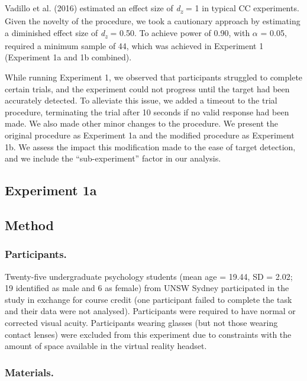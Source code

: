 \documentclass[
  english,
  man,floatsintext]{apa7}
\begin{document}
Vadillo et al. (2016) estimated an effect size of \emph{d\textsubscript{z}} = 1 in typical CC experiments. Given the novelty of the procedure, we took a cautionary approach by estimating a diminished effect size of \emph{d\textsubscript{z}} = 0.50. To achieve power of 0.90, with \(\alpha\) = 0.05, required a minimum sample of 44, which was achieved in Experiment 1 (Experiment 1a and 1b combined).

While running Experiment 1, we observed that participants struggled to complete certain trials, and the experiment could not progress until the target had been accurately detected. To alleviate this issue, we added a timeout to the trial procedure, terminating the trial after 10 seconds if no valid response had been made. We also made other minor changes to the procedure. We present the original procedure as Experiment 1a and the modified procedure as Experiment 1b. We assess the impact this modification made to the ease of target detection, and we include the ``sub-experiment'' factor in our analysis.

\hypertarget{experiment-1a}{%
\subsection{Experiment 1a}\label{experiment-1a}}

\hypertarget{method}{%
\subsection{Method}\label{method}}

\hypertarget{participants.}{%
\subsubsection{Participants.}\label{participants.}}

Twenty-five undergraduate psychology students (mean age = 19.44, SD = 2.02; 19 identified as male and 6 as female) from UNSW Sydney participated in the study in exchange for course credit (one participant failed to complete the task and their data were not analysed). Participants were required to have normal or corrected visual acuity. Participants wearing glasses (but not those wearing contact lenses) were excluded from this experiment due to constraints with the amount of space available in the virtual reality headset.

\hypertarget{materials.}{%
\subsubsection{Materials.}\label{materials.}}
\end{document}
